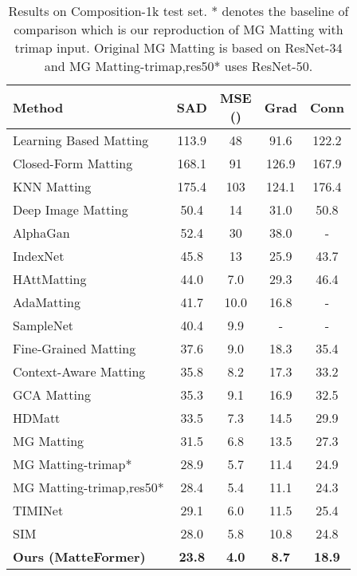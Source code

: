 \documentclass[10pt,twocolumn,letterpaper]{article}
\begin{document}
\begin{table}[t]
  \centering
  \begin{adjustbox}{width = \linewidth}
  \begin{tabular}{l | c c c c}
    \toprule
    Method & SAD & \makecell{MSE \\ ()} & Grad & Conn\\
    \midrule
    Learning Based Matting \cite{zheng2009learning} & 113.9 & 48 & 91.6 & 122.2 \\
    Closed-Form Matting \cite{levin2007closed} & 168.1 & 91 & 126.9 & 167.9 \\
    KNN Matting \cite{chen2013knn} & 175.4 & 103 & 124.1 & 176.4 \\
    Deep Image Matting \cite{xu2017deep} & 50.4 & 14 & 31.0 & 50.8 \\
    AlphaGan \cite{lutz2018alphagan} & 52.4 & 30 & 38.0 & - \\
    IndexNet \cite{lu2019indices} & 45.8 & 13 & 25.9 & 43.7 \\
    HAttMatting \cite{qiao2020attention} & 44.0 & 7.0 & 29.3 & 46.4 \\
    AdaMatting \cite{cai2019disentangled} & 41.7 & 10.0 & 16.8 & - \\
    SampleNet \cite{tang2019learning} & 40.4 & 9.9 & - & - \\
    Fine-Grained Matting \cite{liu2021towards} & 37.6 & 9.0 & 18.3 & 35.4 \\
    Context-Aware Matting \cite{hou2019context} & 35.8 & 8.2 & 17.3 & 33.2 \\
    GCA Matting \cite{li2020natural} & 35.3 & 9.1 & 16.9 & 32.5 \\
    HDMatt \cite{yu2020high} & 33.5 & 7.3 & 14.5 & 29.9 \\
MG Matting \cite{yu2021mask} & 31.5 & 6.8 & 13.5 & 27.3 \\
    MG Matting-trimap* & 28.9 & 5.7 & 11.4 & 24.9 \\
    MG Matting-trimap,res50* & 28.4 & 5.4 & 11.1 & 24.3 \\
    TIMINet \cite{liu2021tripartite} & 29.1 & 6.0 & 11.5 & 25.4 \\
    SIM \cite{sun2021semantic} & 28.0 & 5.8 & 10.8 & 24.8 \\
    \hline
    \bf{Ours (MatteFormer)} & \bf{23.8} & \bf{4.0} & \bf{8.7} & \bf{18.9} \\
    \bottomrule
  \end{tabular}
  \end{adjustbox}
  \caption{Results on Composition-1k test set. * denotes the baseline of comparison which is our reproduction of MG Matting with trimap input. Original MG Matting is based on ResNet-34 and MG Matting-trimap,res50* uses ResNet-50.}
  \label{tab:result_composition1k}
  \vspace{-2mm}
\end{table}
\end{document}
